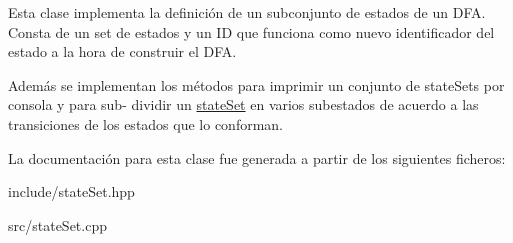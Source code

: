 Esta clase implementa la definición de un subconjunto de estados de un D\+FA. Consta de un set de estados y un ID que funciona como nuevo identificador del estado a la hora de construir el D\+FA.

Además se implementan los métodos para imprimir un conjunto de state\+Sets por consola y para sub-\/ dividir un \mbox{\hyperlink{classstate_set}{state\+Set}} en varios subestados de acuerdo a las transiciones de los estados que lo conforman. 

La documentación para esta clase fue generada a partir de los siguientes ficheros\+:\begin{DoxyCompactItemize}
\item 
include/state\+Set.\+hpp\item 
src/state\+Set.\+cpp\end{DoxyCompactItemize}
